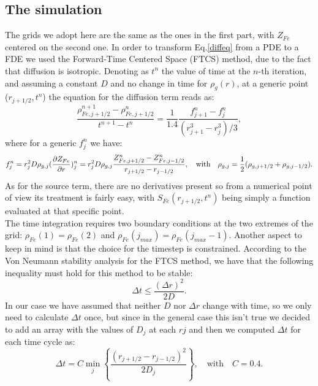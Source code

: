 \documentclass{article}
\begin{document}
\subsection{The simulation}
The grids we adopt here are the same as the ones in the first part, with $Z_{Fe}$ centered on the second one. In order to transform Eq.\eqref{diffeq} from a PDE to a FDE we used the Forward-Time Centered Space (FTCS) method, due to the fact that diffusion is isotropic.
Denoting as $t^{n}$ the value of time at the $n$-th iteration, and assuming a constant $D$ and no change in time for $\rho_{g}(r)$, at a generic point ($r_{j+1/2},t^{n}$) the equation for the diffusion term reads as:
\begin{equation}\label{fdediff}
	\frac{\rho_{Fe,j+1/2}^{n+1}-\rho_{Fe,j+1/2}^{n}}{t^{n+1}-t^{n}}=\frac{1}{1.4}\frac{f_{j+1}^{n}-f_{j}^{n}}{(r_{j+1}^{3}-r_{j}^{3})/3},
\end{equation}
where for a generic $f_{j}^{n}$ we have:
\begin{equation}\label{fnj}
	f_{j}^{n}=r_{j}^{2}D\rho_{g,j}(\pdv{Z_{Fe}}{r})^{n}_{j}=r_{j}^{2}D\rho_{g,j}\frac{Z_{Fe,j+1/2}^{n}-Z^{n}_{Fe,j-1/2}}{r_{j+1/2}-r_{j-1/2}},\quad \text{with} \quad \rho_{g,j}=\frac{1}{2}(\rho_{g,j+1/2}+\rho_{g,j-1/2}).
\end{equation}
As for the source term, there are no derivatives present so from a numerical point of view its treatment is fairly easy, with $S_{Fe}(r_{j+1/2},t^{n})$ being simply a function evaluated at that specific point.\\
The time integration requires two boundary conditions at the two extremes of the grid: $\rho_{Fe}(1)=\rho_{Fe}(2)$ and $\rho_{Fe}(j_{max})=\rho_{Fe}(j_{max}-1)$.
Another aspect to keep in mind is that the choice for the timestep is constrained. According to the Von Neumann stability analysis for the FTCS method, we have that the following inequality must hold for this method to be stable:
\begin{equation}\label{stability}
	\Delta t\le \frac{(\Delta r)^{2}}{2D}.
\end{equation}
In our case we have assumed that neither $D$ nor $\Delta r$ change with time, so we only need to calculate $\Delta t $ once, but since in the general case this isn't true we decided to add an array with the values of $D_{j}$ at each $r{j}$ and then we computed $\Delta t $ for each time cycle as:
\begin{equation}
	\Delta t=C\min_{j}\left\{\frac{(r_{j+1/2}-r_{j-1/2})^{2}}{2D_{j}}\right\},\quad \text{with} \quad C=0.4.
\end{equation}
\end{document}
